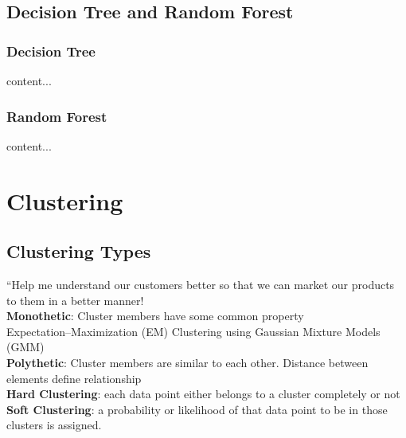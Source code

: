 \documentclass{beamer}
\begin{document}
\begin{frame}

\end{frame}

\begin{frame}

\end{frame}

\begin{frame}

\end{frame}

\subsection{Decision Tree and Random Forest}
\begin{frame}\frametitle{Decision Tree}
	content...
\end{frame}

\begin{frame}\frametitle{Random Forest}
content...
\end{frame}



\section{Clustering}
\subsection{Clustering Types}
\begin{frame}
	“Help me understand our customers better so that we can market our products to them in a better manner!\\
	\textbf{Monothetic}: Cluster members have some common property\\
	Expectation–Maximization (EM) Clustering using Gaussian Mixture Models (GMM)\\
	\textbf{Polythetic}: Cluster members are similar to each other. Distance between elements define relationship\\
	\textbf{Hard Clustering}: each data point either belongs to a cluster completely or not\\
	\textbf{Soft Clustering}: a probability or likelihood of that data point to be in those clusters is assigned.
\end{frame}

\begingroup
\tiny
\end{document}
